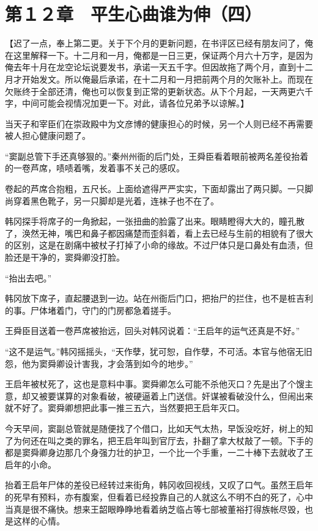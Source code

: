 \section{第１２章　平生心曲谁为伸（四）}

【迟了一点，奉上第二更。关于下个月的更新问题，在书评区已经有朋友问了，俺在这里解释一下。十二月和一月，俺都是一日三更，保证两个月六十万字，是因为俺去年十月在龙空论坛说要发书，承诺一天五千字。但因故拖了两个月，直到十二月才开始发文。所以俺最后承诺，在十二月和一月把前两个月的欠账补上。而现在欠账终于全部还清，俺也可以恢复到正常的更新状态。从下个月起，一天两更六千字，中间可能会视情况加更一下。对此，请各位兄弟予以谅解。】

当天子和宰臣们在崇政殿中为文彦博的健康担心的时候，另一个人则已经不再需要被人担心健康问题了。

“窦副总管下手还真够狠的。”秦州州衙的后门处，王舜臣看着眼前被两名差役抬着的一卷芦席，啧啧着嘴，发着事不关己的感叹。

卷起的芦席合抱粗，五尺长。上面给遮得严严实实，下面却露出了两只脚。一只脚尚穿着黑色靴子，另一只脚却是光着，连袜子也不在了。

韩冈探手将席子的一角掀起，一张扭曲的脸露了出来。眼睛瞪得大大的，瞳孔散了，涣然无神，嘴巴和鼻子都因痛楚而歪斜着，看上去已经与生前的相貌有了很大的区别，这是在剧痛中被杖子打掉了小命的缘故。不过尸体只是口鼻处有血渍，但脸还是干净的，窦舜卿没打脸。

“抬出去吧。”

韩冈放下席子，直起腰退到一边。站在州衙后门口，把抬尸的拦住，也不是桩吉利的事。尸体堵着门，守门的门房都急着搓手。

王舜臣目送着一卷芦席被抬远，回头对韩冈说着：“王启年的运气还真是不好。”

“这不是运气。”韩冈摇摇头，“天作孽，犹可恕，自作孽，不可活。本官与他宿无旧怨，他为窦舜卿设计害我，才会落到如今的地步。”

王启年被杖死了，这也是意料中事。窦舜卿怎么可能不杀他灭口？先是出了个馊主意，却又被要谋算的对象看破，被硬逼着上门送信。奸谋被看破没什么，但闹出来就不好了。窦舜卿想把此事一推三五六，当然要把王启年灭口。

今天早间，窦副总管就是随便找了个借口，比如天气太热，早饭没吃好，树上的知了为何还在叫之类的罪名，把王启年叫到官厅去，扑翻了拿大杖敲了一顿。下手的都是窦舜卿身边那几个身强力壮的护卫，一个比一个手重，一二十棒下去就收了王启年的小命。

抬着王启年尸体的差役已经转过来街角，韩冈收回视线，又叹了口气。虽然王启年的死早有预料，亦有腹案，但看着已经投靠自己的人就这么不明不白的死了，心中当真是很不痛快。想来王韶眼睁睁地看着纳芝临占等七部被董裕打得族帐尽毁，也是这样的心情。

